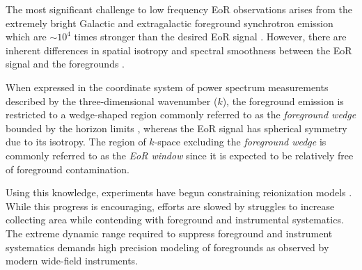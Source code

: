 \documentclass[preprint2,iop,numberedappendix,twocolappendix,appendixfloats]{emulateapj}
\begin{document}
The most significant challenge to low frequency EoR observations arises from the extremely bright Galactic and extragalactic foreground synchrotron emission which are $\sim 10^4$ times stronger than the desired EoR signal \citep{dim02,ali08,ber09,ber10,gho12}. However, there are inherent differences in spatial isotropy and spectral smoothness between the EoR signal and the foregrounds \citep[see, e.g.,][]{fur04b,mor04,zal04,san05,fur06,mcq06,mor06,wan06,gle08}. %

When expressed in the coordinate system of power spectrum measurements described by the three-dimensional wavenumber ($k$), the foreground emission is restricted to a wedge-shaped region commonly referred to as the {\it foreground wedge} \citep{bow09,liu09,liu14a,liu14b,dat10,liu11,gho12,mor12,par12b,tro12,ved12,dil13,pob13,thy13,dil14} bounded by the horizon limits \citep{par12b}, whereas the EoR signal has spherical symmetry due to its isotropy. %
The region of $k$-space excluding the {\it foreground wedge} is commonly referred to as the {\it EoR window} since it is expected to be relatively free of foreground contamination.


Using this knowledge, experiments have begun constraining reionization models \citep{par14,ali15,pob15}. While this progress is encouraging, efforts are slowed by struggles to increase collecting area while contending with foreground and instrumental systematics. The extreme dynamic range required to suppress foreground and instrument systematics demands high precision modeling of foregrounds as observed by modern wide-field instruments. 
\end{document}

